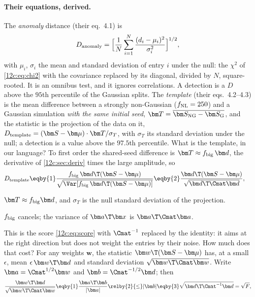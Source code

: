 \paragraph{Their equations, derived.} The \emph{anomaly} distance (their eq.~4.1) is
\begin{equation}
  D_{\rm anomaly}=\Bigl[\frac1N\sum_{i=1}^N\frac{(d_i-\mu_i)^2}{\sigma_i^2}\Bigr]^{1/2},
  \label{12c:eq:anomaly}
\end{equation}
with $\mu_i$, $\sigma_i$ the mean and standard deviation of entry $i$ under the null: the $\chi^2$ of \eqref{12c:eq:chi2} with the covariance
replaced by its diagonal, divided by $N$, square-rooted. It is an omnibus test, and it ignores correlations. A detection is a $D$ above the
$95$th percentile of the Gaussian splits. The \emph{template} (their eqs.~4.2--4.3) is the mean difference between a strongly non-Gaussian
($f_{\rm NL}=250$) and a Gaussian simulation \emph{with the same initial seed}, $\bm T=\overline{\bm S_{\rm NG}-\bm S_{\rm G}}$, and the statistic is the
projection of the data on it, $D_{\rm template}=(\bm S-\bm\mu)\cdot\bm T/\sigma_T$, with $\sigma_T$ its standard deviation under the null; a detection
is a value above the $97.5$th percentile. What is the template, in our language? To first order the shared-seed difference is
$\bm T\approx f_{\rm big}\,\bm d$, the derivative of \cref{12c:sec:deriv} times the large amplitude, so
\begin{align}
  D_{\rm template}
  &\eqby{1}\frac{f_{\rm big}\,\bm d\T(\bm S-\bm\mu)}{\sqrt{\Var[f_{\rm big}\,\bm d\T(\bm S-\bm\mu)]}}
   \eqby{2}\frac{\bm d\T(\bm S-\bm\mu)}{\sqrt{\bm d\T\Cmat\bm d}} ,
  \label{12c:eq:template}
\end{align}
\begin{explain}
  \item $\bm T\approx f_{\rm big}\bm d$, and $\sigma_T$ is the null standard deviation of the projection.
  \item $f_{\rm big}$ cancels; the variance of $\bm a\T\bm x$ is $\bm a\T\Cmat\bm a$.
\end{explain}
This is the score \eqref{12c:eq:score} with $\Cmat^{-1}$ replaced by the identity: it aims at the right direction but does not weight the entries
by their noise. How much does that cost? For any weights $\bm w$, the statistic $\bm w\T(\bm S-\bm\mu)$ has, at a small $\epsilon$, mean $\epsilon\,\bm w\T\bm d$ and
standard deviation $\sqrt{\bm w\T\Cmat\bm w}$. Write $\bm a=\Cmat^{1/2}\bm w$ and $\bm b=\Cmat^{-1/2}\bm d$; then
\begin{align}
  \frac{\bm w\T\bm d}{\sqrt{\bm w\T\Cmat\bm w}}
  \eqby{1}\frac{\bm a\T\bm b}{|\bm a|}
  \relby{2}{\le}|\bm b|
  \eqby{3}\sqrt{\bm d\T\Cmat^{-1}\bm d}=\sqrt F ,
  \label{12c:eq:cauchy}
\end{align}
